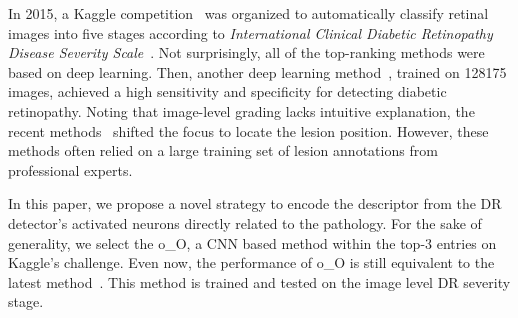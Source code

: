 \documentclass[letterpaper]{article} %
\begin{document}
    
     In 2015, a Kaggle competition~\cite{kaggle2016diabetic} was organized to automatically classify retinal images into five stages according to \textit{International Clinical Diabetic Retinopathy Disease Severity Scale}~\cite{aao2002drscale}. Not surprisingly, all of the top-ranking methods were based on deep learning. Then, another deep learning method~\cite{Gulshan2016jama}, trained on  128175 images, achieved a high sensitivity and specificity for detecting diabetic retinopathy. Noting that image-level grading lacks intuitive explanation, the recent methods~\cite{Yang17MICCAI,wang2017zoom} shifted the focus to locate the lesion position. However, these methods often relied on a large training set of lesion annotations from professional experts.
     
     In this paper, we propose a novel strategy to encode the descriptor from the DR detector's activated neurons directly related to the pathology. For the sake of generality, we select the o\_O\cite{oO2016detector}, a CNN based method within the top-3 entries on Kaggle's challenge. Even now, the performance of o\_O is still equivalent to the latest method~\cite{wang2017zoom}. This method is trained and tested on the image level DR severity stage. 
     
     
     
    
    
    
    
    
    
    
    
    
    
    
    
    
    
    
	
\end{document}
